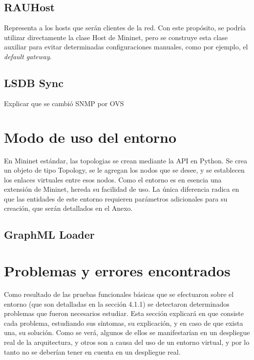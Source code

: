 \subsection{RAUHost}
Representa a los hosts que serán clientes de la red. Con este propósito, se podría utilizar directamente la clase Host de Mininet, pero se construye esta clase auxiliar para evitar determinadas configuraciones manuales, como por ejemplo, el \textit{default gateway}.

\subsection{LSDB Sync}
Explicar que se cambió SNMP por OVS

\section{Modo de uso del entorno}
En Mininet estándar, las topologias se crean mediante la API en Python. Se crea un objeto de tipo Topology, se le agregan los nodos que se desee, y se establecen los enlaces virtuales entre esos nodos. Como el entorno es en esencia una extensión de Mininet, hereda su facilidad de uso. La única diferencia radica en que las entidades de este entorno requieren parámetros adicionales para su creación, que serán detallados en el Anexo.

\subsection{GraphML Loader}

\section{Problemas y errores encontrados}
Como resultado de las pruebas funcionales básicas que se efectuaron sobre el entorno (que son detalladas en la sección 4.1.1) se detectaron determinados problemas que fueron necesarios estudiar. Esta sección explicará en que consiste cada problema, estudiando sus síntomas, su explicación, y en caso de que exista una, su solución. Como se verá, algunos de ellos se manifestarían en un despliegue real de la arquitectura, y otros son a causa del uso de un entorno virtual, y por lo tanto no se deberían tener en cuenta en un despliegue real.

